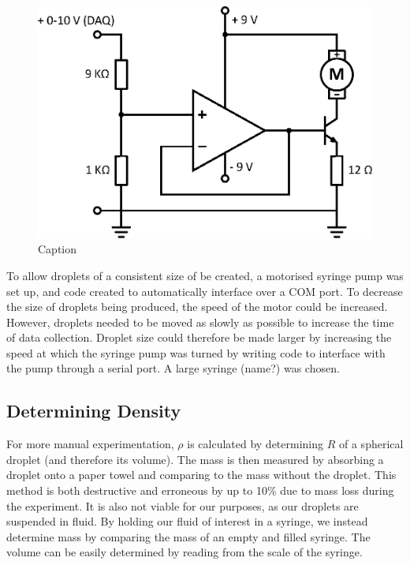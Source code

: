 \documentclass{physics_article_B}
\begin{document}
            \begin{figure}[H]
                \centering
                \hspace*{-1.8cm}\includegraphics[scale=0.8]{Figures/MotorCircuit.eps}
                \caption{Caption}
                \label{fig:MotorCircuit}
            \end{figure}
        
        To allow droplets of a consistent size of be created, a motorised syringe pump was set up, and code created to automatically interface over a COM port. To decrease the size of droplets being produced, the speed of the motor could be increased. However, droplets needed to be moved as slowly as possible to increase the time of data collection. Droplet size could therefore be made larger by increasing the speed at which the syringe pump was turned by writing code to interface with the pump through a serial port. A large syringe (name?) was chosen.
        
        
    \subsection{Determining Density}
    
        For more manual experimentation, $\rho$ is calculated by determining $R$ of a spherical droplet (and therefore its volume). The mass is then measured by absorbing a droplet onto a paper towel and comparing to the mass without the droplet\cite{hill}. This method is both destructive and erroneous by up to 10\%\cite{harrold2016optovibrometry} due to mass loss during the experiment. It is also not viable for our purposes, as our droplets are suspended in fluid. 
        By holding our fluid of interest in a syringe, we instead determine mass by comparing the mass of an empty and filled syringe. The volume can be easily determined by reading from the scale of the syringe.\\
    
\end{document}
